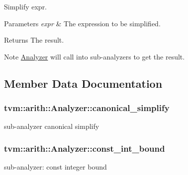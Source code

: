 Simplify expr. 


\begin{DoxyParams}{Parameters}
{\em expr} & The expression to be simplified. \\
\hline
\end{DoxyParams}
\begin{DoxyReturn}{Returns}
The result.
\end{DoxyReturn}
\begin{DoxyNote}{Note}
\hyperlink{classtvm_1_1arith_1_1Analyzer}{Analyzer} will call into sub-\/analyzers to get the result. 
\end{DoxyNote}


\subsection{Member Data Documentation}
\subsubsection[{\texorpdfstring{canonical\+\_\+simplify}{canonical_simplify}}]{ tvm\+::arith\+::\+Analyzer\+::canonical\+\_\+simplify}\hypertarget{classtvm_1_1arith_1_1Analyzer_a6cdf29adeceaa20b8c3dd7c26b92cd00}{}\label{classtvm_1_1arith_1_1Analyzer_a6cdf29adeceaa20b8c3dd7c26b92cd00}


sub-\/analyzer canonical simplify 

\subsubsection[{\texorpdfstring{const\+\_\+int\+\_\+bound}{const_int_bound}}]{ tvm\+::arith\+::\+Analyzer\+::const\+\_\+int\+\_\+bound}\hypertarget{classtvm_1_1arith_1_1Analyzer_a435eba3ac3a839d3c53b74acfdc10146}{}\label{classtvm_1_1arith_1_1Analyzer_a435eba3ac3a839d3c53b74acfdc10146}


sub-\/analyzer\+: const integer bound 

